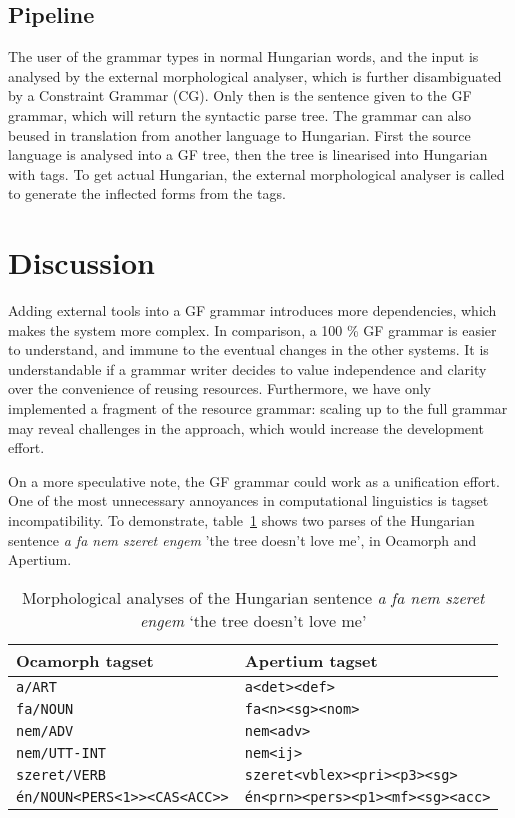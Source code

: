 \documentclass[10pt,a4paper]{article}
\begin{document}
\subsection{Pipeline}

The user of the grammar types in normal Hungarian words, and the input is analysed 
by the external morphological analyser, which is further disambiguated by a 
Constraint Grammar (CG). Only then is the sentence given to the GF grammar, 
which will return the syntactic parse tree.
The grammar can also beused in translation from another language
to Hungarian. First the source language is analysed into a GF tree,
then the tree is linearised into Hungarian with tags. To get actual
Hungarian, the external morphological analyser is called to generate
the inflected forms from the tags.



\section{Discussion}


Adding external tools into a GF grammar introduces more dependencies,
which makes the system more complex. In comparison, a 100 \% GF
grammar is easier to understand, and immune to the eventual changes in
the other systems. It is understandable if a grammar writer decides to
value independence and clarity over the convenience of reusing resources.
Furthermore, we have only implemented a fragment of the resource grammar:
scaling up to the full grammar may reveal challenges in the approach,
which would increase the development effort.

On a more speculative note, the GF grammar could work as a unification effort.
One of the most unnecessary annoyances in computational linguistics is
tagset incompatibility. To demonstrate, table~\ref{table:treeDoesntLove} shows two parses of the Hungarian sentence \emph{a fa nem szeret engem} 'the tree doesn't love me', in Ocamorph and Apertium.


\begin{table}[t!]
\center
    \begin{tabular}{l|l}
    Ocamorph tagset & Apertium tagset \\ \hline
    \texttt{a/ART}       & \texttt{a<det><def>}       \\
    \texttt{fa/NOUN}              & \texttt{fa<n><sg><nom>}            \\
    \texttt{nem/ADV}     &  \texttt{nem<adv>} \\
    \texttt{nem/UTT-INT} &  \texttt{nem<ij>}  \\
    \texttt{szeret/VERB}          & \texttt{szeret<vblex><pri><p3><sg>} \\
    \texttt{\'{e}n/NOUN<PERS<1>><CAS<ACC>>} & \texttt{\'{e}n<prn><pers><p1><mf><sg><acc>}  \\
    \end{tabular}
\label{table:treeDoesntLove}
\caption{Morphological analyses of the Hungarian sentence \emph{a fa
    nem szeret engem} `the tree doesn't love me'}
\end{table}
\end{document}
